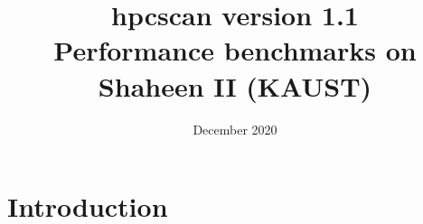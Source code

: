\documentclass[usenames,dvipsnames]{beamer}
\title[hpcscan benchmarks on Shaheen II]{hpcscan version 1.1 \\ Performance benchmarks on Shaheen II (KAUST)}
\date[Dec 2020] {\small{December 2020 }}
\begin{document}
\scriptsize

\maketitle 

\clearpage



\section{Introduction}

\end{document}
